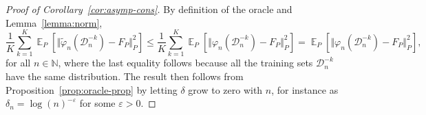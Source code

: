 \documentclass[lineno]{biometrika}
\DeclareMathOperator{\E}{\mathbb{E}} %
\newcommand{\N}{\mathbb{N}}
\renewcommand{\phi}{\varphi}
\renewcommand{\epsilon}{\varepsilon}
\newcommand{\1}{\mathds{1}}
\newcommand{\data}{\ensuremath{\mathcal{D}}}
\begin{document}
\begin{proof}[Proof of Corollary~\ref{cor:asymp-cons}]
  By definition of the oracle and Lemma~\ref{lemma:norm},
  \begin{equation*}
    \frac{1}{K} \sum_{k=1}^{K} \E_{P}{\left[ \Vert \tilde{\phi}_n(\data_n^{-k}) - F_P \Vert_{P}^2
      \right]} \leq
    \frac{1}{K} \sum_{k=1}^{K}\E_{P}{\left[ \Vert
        \phi_n(\data_n^{-k}) - F_P \Vert_{P}^2
      \right]}
    =
    \E_{P}{\left[ \Vert \phi_n(\data_n^{-k}) - F_P \Vert_{P}^2
      \right]},
  \end{equation*}
  for all \( n \in \N \), where the last equality follows because all
  the training sets \( \data_n^{-k} \) have the same distribution. The
  result then follows from Proposition~\ref{prop:oracle-prop} by
  letting $\delta$ grow to zero with \( n \), for instance as
  $\delta_n = \log(n)^{-\epsilon}$ for some $\epsilon>0$.
\end{proof}









 
\end{document}
